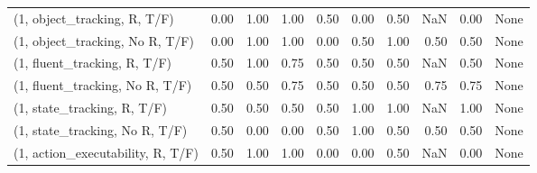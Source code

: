 \begin{table*}[h!]
\begin{adjustbox}{width=2\columnwidth,center}
\begin{tabular}{lrrr|rrr|rrr}
\midrule
(1, object\_tracking, R, T/F)         &                      0.00 &                  1.00 &                      1.00 &                          0.50 &                      0.00 &                          0.50 &                                    NaN &                               0.00 &                                  None \\
(1, object\_tracking, No R, T/F)      &                      0.00 &                  1.00 &                      1.00 &                          0.00 &                      0.50 &                          1.00 &                                   0.50 &                               0.50 &                                  None \\
(1, fluent\_tracking, R, T/F)         &                      0.50 &                  1.00 &                      0.75 &                          0.50 &                      0.50 &                          0.50 &                                    NaN &                               0.50 &                                  None \\
(1, fluent\_tracking, No R, T/F)      &                      0.50 &                  0.50 &                      0.75 &                          0.50 &                      0.50 &                          0.50 &                                   0.75 &                               0.75 &                                  None \\
(1, state\_tracking, R, T/F)          &                      0.50 &                  0.50 &                      0.50 &                          0.50 &                      1.00 &                          1.00 &                                    NaN &                               1.00 &                                  None \\
(1, state\_tracking, No R, T/F)       &                      0.50 &                  0.00 &                      0.00 &                          0.50 &                      1.00 &                          0.50 &                                   0.50 &                               0.50 &                                  None \\
(1, action\_executability, R, T/F)    &                      0.50 &                  1.00 &                      1.00 &                          0.00 &                      0.00 &                          0.50 &                                    NaN &                               0.00 &                                  None \\

\end{tabular}
\end{adjustbox}
\end{table*}
